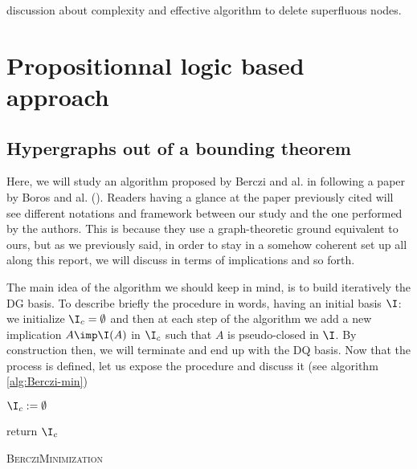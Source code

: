 discussion about complexity and effective algorithm to delete superfluous nodes.


\section{Propositionnal logic based approach}

\subsection{Hypergraphs out of a bounding theorem}

Here, we will study an algorithm proposed by Berczi and al. in 
\cite{berczi_directed_2017} following a paper by Boros and al. 
(\cite{boros_strong_2017}). Readers having a glance at the paper previously 
cited will see different notations and framework between our study and the one 
performed by the authors. This is because they use a graph-theoretic ground 
equivalent to ours, but as we previously said, in order to stay in a somehow 
coherent set up all along this report, we will discuss in terms of implications 
and so forth.

\vspace{1.2em}

The main idea of the algorithm we should keep in mind, is to build iteratively
the DG basis. To describe briefly the procedure in words, having an initial 
basis $\I$: we initialize $\I_c = \emptyset$ and then at each step of the 
algorithm we add a new implication $A \imp \I(A)$ in $\I_c$ such that $A$ is 
pseudo-closed in $\I$. By construction then, we will terminate and end up with 
the DQ basis. Now that the process is defined, let us expose the procedure
and discuss it (see algorithm \ref{alg:Berczi-min})

\begin{algorithm}
	
	\BlankLine
	\BlankLine
	
	$\I_c := \emptyset$ \;
	
	
	return $\I_c$ \;
	
	\caption{\textsc{BercziMinimization}}
	\label{alg:Berczi-min}
\end{algorithm}

